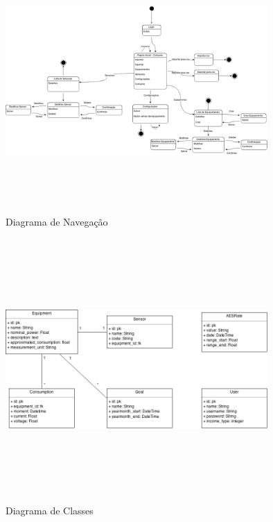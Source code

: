 \begin{figure}[H]
\begin{center}
\includegraphics[width=10cm,height=10cm,keepaspectratio]{figuras/diagrama_navegacao.png}
\caption{\label{fig:diagrama navegacao} Diagrama de Navegação}
\end{center}
\end{figure}

\begin{figure}[H]
\begin{center}
\includegraphics[width=10cm,height=10cm,keepaspectratio]{figuras/diagrama_classes.png}
\caption{\label{fig:diagrama classes} Diagrama de Classes}
\end{center}
\end{figure}

